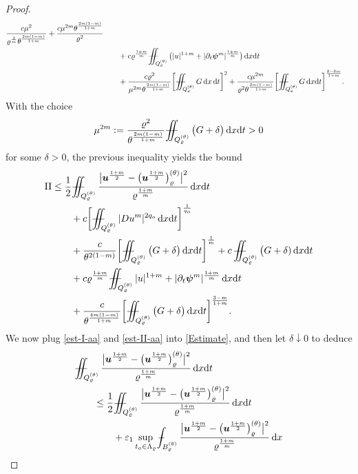 \documentclass[a4paper, 10pt, american]{amsart}
\numberwithin{theorem}{section}
\numberwithin{equation}{section}
\newcommand{\dxdt}{\,\mathrm{d}x\mathrm{d}t}
\newcommand{\dx}{\,\mathrm{d}x}
\newcommand{\dt}{\,\mathrm{d}t}
\renewcommand{\epsilon}{\varepsilon}
\renewcommand{\epsilon}{\varepsilon}
\renewcommand{\rho}{\varrho}
\newcommand{\power}[2]{\bm{#1^{\mbox{\unboldmath{\scriptsize$#2$}}}}}
\def\Xint#1{\mathchoice
    {\XXint\displaystyle\textstyle{#1}}%
    {\XXint\textstyle\scriptstyle{#1}}%
    {\XXint\scriptstyle\scriptscriptstyle{#1}}%
    {\XXint\scriptscriptstyle\scriptscriptstyle{#1}}%
    \!\int}
\def\XXint#1#2#3{\setbox0=\hbox{$#1{#2#3}{\int}$}
    \vcenter{\hbox{$#2#3$}}\kern-0.5\wd0}
\def\bint{\Xint-}
\def\Xiint#1{\mathchoice
    {\XXiint\displaystyle\textstyle{#1}}%
    {\XXiint\textstyle\scriptstyle{#1}}%
    {\XXiint\scriptstyle\scriptscriptstyle{#1}}%
    {\XXiint\scriptscriptstyle\scriptscriptstyle{#1}}%
    \!\iint}
\def\XXiint#1#2#3{\setbox0=\hbox{$#1{#2#3}{\iint}$}
    \vcenter{\hbox{$#2#3$}}\kern-0.5\wd0}
\def\biint{\Xiint{-\!-}}
\begin{document}
\begin{proof}
\begin{align}
\frac{c\mu^2}{\rho^{\frac2m}\theta^{\frac{2m(1-m)}{1+m}}}
+
\frac{c\mu^{2m}\theta^{\frac{2m(1-m)}{1+m}}}{\rho^2} \\\nonumber
&\quad\quad+
c\rho^{\frac{1+m}m}
\biint_{Q_\rho^{(\theta)}}\big(|u|^{1+m}+ |\partial_t \power \psi m|^{\frac{1+m}{m}}\big) \dxdt \\
&\quad\quad
+
  \frac{c\rho^{2}}{\mu^{2m}\theta^{\frac{2m(1-m)}{1+m}}}
\bigg[  \biint_{Q_\rho^{(\theta)}}G\dx\dt\bigg]^2
  +
\frac{c\mu^{2m}}{\rho^2\theta^{\frac{2m(1-m)}{1+m}}}\bigg[\biint_{Q_\rho^{(\theta)}}G
\dxdt\bigg]^{\frac{2-2m}{1+m}}.
\end{align}
With the choice 
\begin{align*}
\mu^{2m}:=\frac{\rho^2}{\theta^{\frac{2m(1-m)}{1+m}} }\biint_{Q_\rho^{(\theta)}} \big(G+ \delta\big)\dxdt>0
\end{align*}
for some $\delta>0$, the previous inequality yields the bound
\begin{align}\label{est-II-aa}
\nonumber
{\rm{II}}
&\le
\frac12 \biint_{Q_{\rho}^{(\theta)}}\frac{\big|\power u{\frac{1+m}2} - \big( \power u{\frac{1+m}2}\big)_{\rho}^{(\theta)}\big|^2}{\rho^{\frac{1+m}m}} \dxdt \\\nonumber
&\qquad+
c\bigg[ \biint_{Q_\rho^{(\theta)}} |Du^m|^{2q_o}\dxdt\bigg]^{\frac1{q_o}}\\\nonumber
&\qquad
+
\frac c{\theta^{2(1-m)}}\bigg[ \biint_{Q_\rho^{(\theta)}} \big(G+ \delta\big) \dxdt\bigg]^{\frac1m}
+
c\,\biint_{Q_\rho^{(\theta)}}\big(G+\delta)\dxdt
\\\nonumber
&\qquad+
c\rho^{\frac{1+m}m}
\biint_{Q_\rho^{(\theta)}}|u|^{1+m}+ |\partial_t \power \psi m|^{\frac{1+m}{m}} \dxdt \\
&\qquad+
  \frac{c}{\theta^{\frac{4m(1-m)}{1+m}}}\bigg[
\biint_{Q_\rho^{(\theta)}}\big(G+\delta\big)
\dxdt\bigg]^{\frac{3-m}{1+m}}.
\end{align}
We now plug \eqref{est-I-aa} and \eqref{est-II-aa} into \eqref{Estimate}, and then let $\delta\downarrow0$ to deduce
\begin{align}\label{pre-poincare-est}
\nonumber
&\biint_{Q_{\rho}^{(\theta)}}\frac{\big|\power u{\frac{1+m}2} - \big( \power u{\frac{1+m}2}\big)_{\rho}^{(\theta)}\big|^2}{\rho^{\frac{1+m}m}} \dxdt \\\nonumber
&\qquad\le
\frac12 \biint_{Q_{\rho}^{(\theta)}}\frac{\big|\power u{\frac{1+m}2} -
  \big( \power
  u{\frac{1+m}2}\big)_{\rho}^{(\theta)}\big|^2}{\rho^{\frac{1+m}m}}
\dxdt\\\nonumber
&\qquad\qquad+
\epsilon_1\sup_{t_o\in\Lambda_\rho}\bint_{B_{\rho}^{(\theta)}}\frac{\big|\power u{\frac{1+m}2} - \big( \power u{\frac{1+m}2}\big)_{\rho}^{(\theta)}\big|^2}{\rho^{\frac{1+m}m}} \dx

\end{align}
\end{proof}
\end{document}
